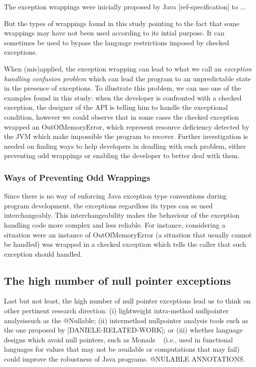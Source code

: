 \documentclass[conference]{IEEEtran}
\begin{document}
The exception wrappings were inicially proposed by Java [ref-specification] to ...

But the types of wrappings found in this study pointing to the fact that some wrappings may have not 
been used according to its intial purpose. It can sometimes be used to bypass the  
language restrictions imposed by checked exceptions.

When (mis)applied, the exception wrapping can lead to what we call
an \emph{exception handling confusion problem} which can lead the program to
an unpredictable state in the presence of exceptions. To illustrate this problem, we can use
 one of the examples found in this study: when the developer is 
confronted with a checked exception, the designer of the API is telling him 
to handle the exceptional condition, however we could observe that in some cases the 
checked exception wrapped an OutOfMemoryError, which represent resource deficiency detected 
by the JVM which make impossible the program to recover. Further investigation is needed on finding 
ways to help developers in deadling with such problem, either preventing odd wrappings or enabling 
the developer to better deal with them. 


\subsubsection{Ways of Preventing Odd Wrappings}

Since there is no way of enforcing Java exception type conventions during program development,
the exceptions regardless its types can se used interchangeably. This interchangeability makes the
behaviour of the exception handling code more complex and less reliable. For
instance, considering a situation were an instance of OutOfMemoryError (a situation that usually cannot
 be handled) was wrapped in a checked exception which tells the caller that such exception should
handled.



\subsection{The high number of null pointer exceptions}  
Last but not least, the high number of null pointer exceptions  lead us to think on other 
pertinent research direction: (i) lightweight intra-method nullpointer analysissuch as the @Nullable;
(ii) intermethod nullpointer analysis tools such as the one proposed by [DANIELE-RELATED-WORK];
or (iii) whether language designs which avoid null pointers, such 
as Monads ~\cite{Walde95} (i.e., used in functional languages for values that may not be available 
or computations that may fail) could improve the robustness of Java programs. 
@NULABLE ANNOTATIONS.
\end{document}
